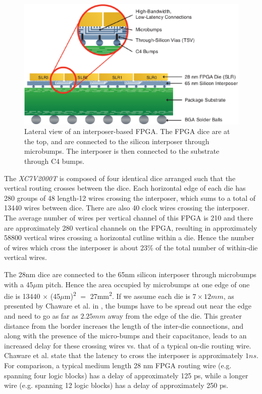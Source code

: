 \documentclass[journal]{IEEEtran}
\begin{document}
\begin{figure}[!htbp]
\centering
\includegraphics[width=\linewidth]{interposer.eps}
\caption{Lateral view of an interposer-based FPGA\cite{xilinxWP}. The FPGA dice are at the top, and are connected to the silicon interposer through microbumps. The interposer is then connected to the substrate through C4 bumps.}
\label{fig:interposer}
\end{figure}


The \textit{XC7V2000T} is composed of four identical dice arranged such that the vertical routing crosses between the dice. Each horizontal edge of each die has 280 groups of 48 length-12 wires crossing the interposer, which sums to a total of 13440 wires between dice. There are also 40 clock wires crossing the interposer. The average number of wires per vertical channel of this FPGA is 210 and there are approximately 280 vertical channels on the FPGA, resulting in approximately 58800 vertical wires crossing a horizontal cutline within a die. Hence the number of wires which cross the interposer is about 23\% of the total number of within-die vertical wires.

The 28nm dice are connected to the 65nm silicon interposer through microbumps with a 45$\mu$m pitch. Hence the area occupied by microbumps at one edge of one die is 13440 $\times$ (45$\mu$m)\textsuperscript{2} $=$ 27mm\textsuperscript{2}. If we assume each die is $7 \times 12 mm$, as presented by Chaware et al. in \cite{xilinxTSV}, the bumps have to be spread out near the edge and need to go as far as $2.25mm$ away from the edge of the die. This greater distance from the border increaes the length of the inter-die connections, and along with the presence of the micro-bumps and their capacitance, leads to an increased delay for these crossing wires vs. that of a typical on-die routing wire. Chaware et al. state that the latency to cross the interposer is approximately $1ns$. For comparison, a typical medium length 28 nm FPGA routing wire (e.g. spanning four logic blocks) has a delay of approximately 125 ps, while a longer wire (e.g. spanning 12 logic blocks) has a delay of approximately 250 ps.
\end{document}
